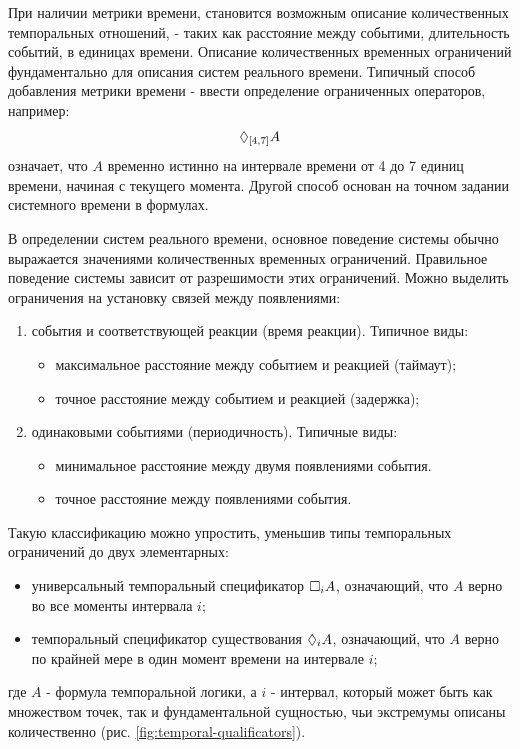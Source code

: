 		 При наличии метрики времени, становится возможным описание количественных темпоральных отношений, - таких как расстояние между событими, длительность событий, в единицах времени.
		 Описание количественных временных ограничений фундаментально для описания систем реального времени. Типичный способ добавления метрики времени - ввести определение ограниченных операторов, например: \[\lozenge_{[4,7]}A \]
		 означает, что $ A $ временно истинно на интервале времени от 4 до 7 единиц времени, начиная с текущего момента.
		 Другой способ основан на точном задании системного времени в формулах.
		 
		В определении систем реального времени, основное поведение системы обычно выражается значениями количественных временных ограничений. Правильное поведение системы зависит от разрешимости этих ограничений.
		Можно выделить ограничения на установку связей между появлениями:
		\begin{enumerate}
			\item события и соответствующей реакции (время реакции). Типичное виды:
			\begin{itemize}
				\item максимальное расстояние между событием и реакцией (таймаут);
				\item точное расстояние между событием и реакцией (задержка);
			\end{itemize}
			\item одинаковыми событиями (периодичность). Типичные виды:
			\begin{itemize}
				\item минимальное расстояние между двумя появлениями события.
				\item точное расстояние между появлениями события.
			\end{itemize}
		\end{enumerate}
	
		Такую классификацию можно упростить, уменьшив типы темпоральных ограничений до двух элементарных:
		\begin{itemize}
			\item универсальный темпоральный спецификатор $ \square_i A $, означающий, что $ A $ верно во все моменты интервала $ i $;
			\item темпоральный спецификатор существования $ \lozenge_i A $, означающий, что $ A $ верно по крайней мере в один момент времени на интервале $ i $;
		\end{itemize}
		где $ A $ - формула темпоральной логики, а $ i $ - интервал, который может быть как множеством точек, так и фундаментальной сущностью, чьи экстремумы описаны количественно (рис. \ref{fig:temporal-qualificators}).
		
